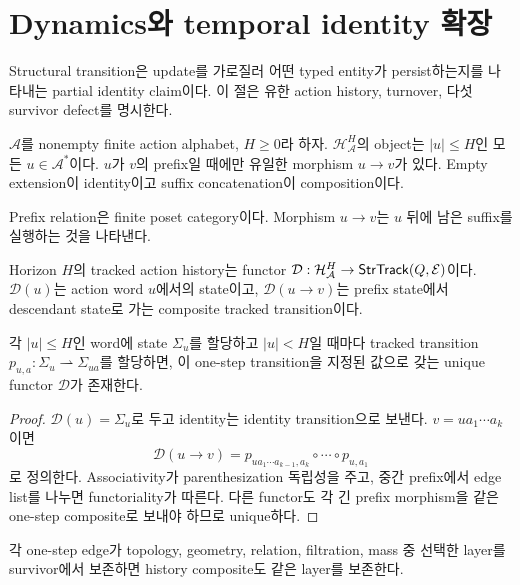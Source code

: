 \section{Dynamics와 temporal identity 확장}

Structural transition은 update를 가로질러 어떤 typed entity가 persist하는지를
나타내는 partial identity claim이다. 이 절은 유한 action history, turnover,
다섯 survivor defect를 명시한다.

\begin{definition}
$\mathcal A$를 nonempty finite action alphabet, $H\geq0$라 하자.
$\mathcal H_{\mathcal A}^H$의 object는 $|u|\leq H$인 모든
$u\in\mathcal A^*$이다. $u$가 $v$의 prefix일 때에만 유일한 morphism
$u\to v$가 있다. Empty extension이 identity이고 suffix concatenation이
composition이다.
\end{definition}

Prefix relation은 finite poset category이다. Morphism $u\to v$는 $u$ 뒤에
남은 suffix를 실행하는 것을 나타낸다.

\begin{definition}
Horizon $H$의 tracked action history는 functor
$\mathcal D:\mathcal H_{\mathcal A}^H\to\mathsf{StrTrack}(Q,\mathcal E)$이다.
$\mathcal D(u)$는 action word $u$에서의 state이고,
$\mathcal D(u\to v)$는 prefix state에서 descendant state로 가는 composite
tracked transition이다.
\end{definition}

\begin{theorem}
각 $|u|\leq H$인 word에 state $\Sigma_u$를 할당하고 $|u|<H$일 때마다
tracked transition $p_{u,a}:\Sigma_u\rightharpoonup\Sigma_{ua}$를 할당하면,
이 one-step transition을 지정된 값으로 갖는 unique functor $\mathcal D$가
존재한다.
\end{theorem}

\begin{proof}
$\mathcal D(u)=\Sigma_u$로 두고 identity는 identity transition으로 보낸다.
$v=ua_1\cdots a_k$이면
\[
\mathcal D(u\to v)=
p_{ua_1\cdots a_{k-1},a_k}\circ\cdots\circ p_{u,a_1}
\]
로 정의한다. Associativity가 parenthesization 독립성을 주고, 중간 prefix에서
edge list를 나누면 functoriality가 따른다. 다른 functor도 각 긴 prefix
morphism을 같은 one-step composite로 보내야 하므로 unique하다.
\end{proof}

\begin{theorem}
각 one-step edge가 topology, geometry, relation, filtration, mass 중 선택한
layer를 survivor에서 보존하면 history composite도 같은 layer를 보존한다.
\end{theorem}

